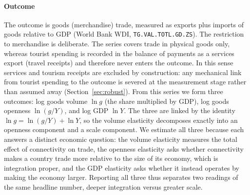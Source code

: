 \paragraph{\textbf{Outcome}} The outcome is goods (merchandise) trade, measured as
exports plus imports of goods relative to GDP (World Bank WDI,
\texttt{TG.VAL.TOTL.GD.ZS}). The restriction to merchandise is deliberate. The series covers trade in physical goods only, whereas tourist spending is
recorded in the balance of payments as a services export (travel receipts)
and therefore never enters the outcome. In this sense services and tourism
receipts are excluded by construction: any mechanical link from tourist
spending to the outcome is severed at the measurement stage rather than
assumed away (Section~\ref{sec:robust}). From this series we form
three outcomes: log goods volume $\ln g$ (the share multiplied by GDP), log
goods openness $\ln(g/Y)$, and log GDP $\ln Y$. The three are linked by the
identity $\ln g = \ln(g/Y) + \ln Y$, so the volume elasticity decomposes
exactly into an openness component and a scale component. We estimate all
three because each answers a distinct economic question: the volume elasticity measures the total effect of connectivity on trade, the openness elasticity asks whether connectivity makes a country trade more relative to the size of its economy, which is integration proper, and the GDP elasticity asks whether it instead operates by making the economy larger. Reporting all three thus separates two readings of the same headline number, deeper integration versus greater scale.

